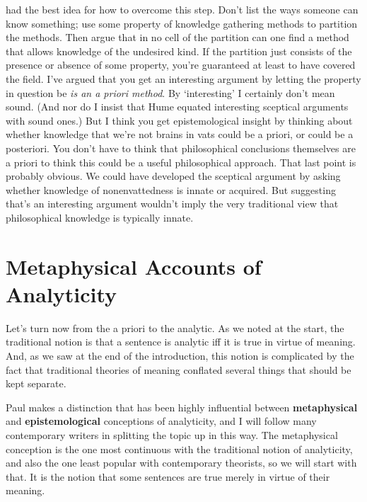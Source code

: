  \citet{HumeTreatise} had the best idea for how to overcome this step. Don't list the ways someone can know something; use some property of knowledge gathering methods to partition the methods. Then argue that in no cell of the partition can one find a method that allows knowledge of the undesired kind. If the partition just consists of the presence or absence of some property, you're guaranteed at least to have covered the field. I've argued  \citet{Weatherson2007} that you get an interesting argument by letting the property in question be \emph{is an a priori method}. By `interesting' I certainly don't mean sound. (And nor do I insist that Hume equated interesting sceptical arguments with sound ones.) But I think you get epistemological insight by thinking about whether knowledge that we're not brains in vats could be a priori, or could be a posteriori. You don't have to think that philosophical conclusions themselves are a priori to think this could be a useful philosophical approach. That last point is probably obvious. We could have developed the sceptical argument by asking whether knowledge of nonenvattedness is innate or acquired. But suggesting that's an interesting argument wouldn't imply the very traditional view that philosophical knowledge is typically innate.

\section{Metaphysical Accounts of Analyticity}
\label{metaphysicalaccountsofanalyticity}

Let's turn now from the a priori to the analytic. As we noted at the start, the traditional notion is that a sentence is analytic iff it is true in virtue of meaning. And, as we saw at the end of the introduction, this notion is complicated by the fact that traditional theories of meaning conflated several things that should be kept separate.

Paul \citet{Boghossian1996-BOGAR} makes a distinction that has been highly influential between \textbf{metaphysical} and \textbf{epistemological} conceptions of analyticity, and I will follow many contemporary writers in splitting the topic up in this way. The metaphysical conception is the one most continuous with the traditional notion of analyticity, and also the one least popular with contemporary theorists, so we will start with that. It is the notion that some sentences are true merely in virtue of their meaning.


